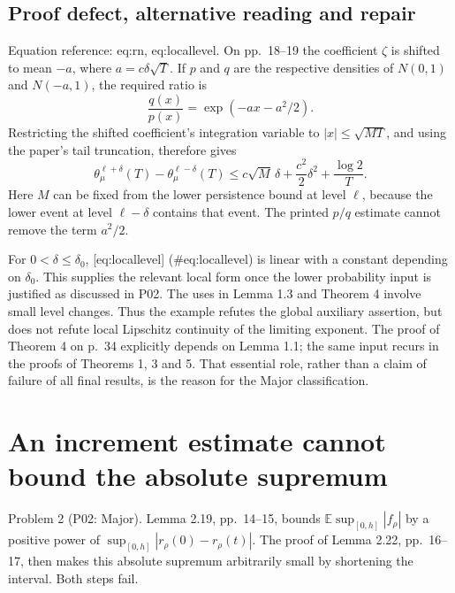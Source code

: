 \documentclass[10pt]{article}
\begin{document}
\subsection*{Proof defect, alternative reading and repair}
Equation reference: eq:rn, eq:locallevel. On pp. 18–19 the coefficient \(\zeta\) is shifted to mean \(-a\), where \(a=c\delta\sqrt T\). If \(p\) and \(q\) are the respective densities of \(N(0,1)\) and \(N(-a,1)\), the required ratio is \[\frac{q(x)}{p(x)}=\exp(-ax-a^2/2).
 \] Restricting the shifted coefficient’s integration variable to \(|x|\le\sqrt{MT}\), and using the paper’s tail truncation, therefore gives \[\theta_\mu^{\ell+\delta}(T)-\theta_\mu^{\ell-\delta}(T)
 \le c\sqrt M\,\delta+\frac{c^2}{2}\delta^2+\frac{\log2}{T}.
 \] Here \(M\) can be fixed from the lower persistence bound at level \(\ell\), because the lower event at level \(\ell-\delta\) contains that event. The printed \(p/q\) estimate cannot remove the term \(a^2/2\).\par
For \(0<\delta\le\delta_0\), [eq:locallevel] (\#eq:locallevel) is linear with a constant depending on \(\delta_0\). This supplies the relevant local form once the lower probability input is justified as discussed in P02. The uses in Lemma 1.3 and Theorem 4 involve small level changes. Thus the example refutes the global auxiliary assertion, but does not refute local Lipschitz continuity of the limiting exponent. The proof of Theorem 4 on p. 34 explicitly depends on Lemma 1.1; the same input recurs in the proofs of Theorems 1, 3 and 5. That essential role, rather than a claim of failure of all final results, is the reason for the Major classification.\par
\section*{An increment estimate cannot bound the absolute supremum}
Problem 2 (P02: Major).  Lemma 2.19, pp. 14–15, bounds \(\mathbb E\sup_{[0,h]}|f_\rho|\) by a positive power of \(\sup_{[0,h]}|r_\rho(0)-r_\rho(t)|\). The proof of Lemma 2.22, pp. 16–17, then makes this absolute supremum arbitrarily small by shortening the interval. Both steps fail.\par
\end{document}
